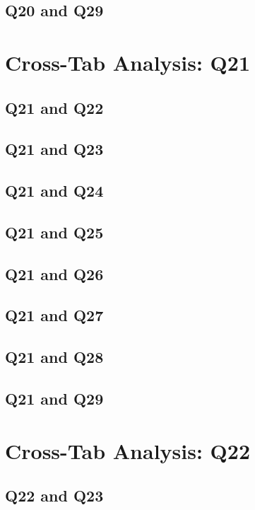 \documentclass{report}
\begin{document}
\section{Q20 and Q29}\clearpage

\chapter{Cross-Tab Analysis: Q21}

\section{Q21 and Q22}\clearpage
\section{Q21 and Q23}\clearpage
\section{Q21 and Q24}\clearpage
\section{Q21 and Q25}\clearpage
\section{Q21 and Q26}\clearpage
\section{Q21 and Q27}\clearpage
\section{Q21 and Q28}\clearpage
\section{Q21 and Q29}\clearpage

\chapter{Cross-Tab Analysis: Q22}

\section{Q22 and Q23}\clearpage
\end{document}
